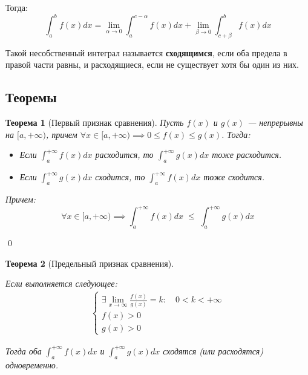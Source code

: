 \documentclass[a4paper,12pt,oneside]{extbook}
\newcommand{\newpar}{$ $\par\nobreak\ignorespaces}
\theoremstyle{numbered}
\theoremstyle{unnumbered}
\theoremstyle{named}
\newtheorem{theorem}{Теорема}[section]
\theoremstyle{unnumbered}
\theoremstyle{named}
\theoremstyle{named}
\theoremstyle{named}
\renewenvironment{proof}{{\noindent\textbf{Доказательство.}}}{\qed}
\begin{document}
Тогда:
\begin{equation}
    \int_a^b f(x)dx = \lim_{\alpha \to 0}{\displaystyle \int_a^{c - \alpha}f(x)dx} + \lim_{\beta \to 0}{\int_{c + \beta}^b f(x)dx}
\end{equation}

Такой несобственный интеграл называется \textbf{сходящимся}, если оба предела в правой части равны, и расходящиеся, если не существует хотя бы один из них.


\subsection{Теоремы}%
\label{sub:Теоремы}


\begin{theorem}[Первый признак сравнения]
    Пусть \(f(x)\) и \(g(x)\) — непрерывны на \([a, +\infty)\), причем \(\forall x \in [a, +\infty) \implies 0 \leq f(x) \leq g(x)\). Тогда:
    \begin{itemize}
        \item {Если \(\int_a^{+\infty}f(x)dx\) расходится, то \(\int_a^{+\infty}g(x)dx\) тоже расходится.}
        \item {Если \(\int_a^{+\infty}g(x)dx\) сходится, то \(\int_a^{+\infty}f(x)dx\) тоже сходится.}
    \end{itemize}

    Причем:
    \[
        \forall x \in [a, +\infty) \implies \int_a^{+\infty} f(x)dx \; \leq \; \int_a^{+\infty} g(x)dx
    \]
\end{theorem}

\begin{proof}
\end{proof}

\begin{theorem}[Предельный признак сравнения]
    \newpar
    Если выполняется следующее:
    \begin{gather*}
        \begin{cases}
            \displaystyle \exists \lim_{x \to \infty}{\frac{f(x)}{g(x)}} = k: \quad 0 < k < +\infty \\
            f(x) > 0                                                                                \\
            g(x) > 0
        \end{cases}
    \end{gather*}

    Тогда оба \(\int_a^{+\infty} f(x)dx\) и \(\int_a^{+\infty} g(x)dx\) сходятся (или расходятся) одновременно.
\end{theorem}
\end{document}
